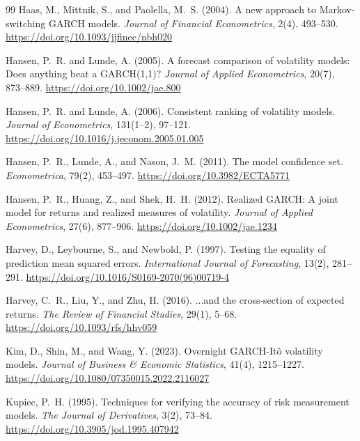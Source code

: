 \documentclass[11pt,a4paper]{article}
\begin{document}
\begin{thebibliography}{99}
Haas, M., Mittnik, S., and Paolella, M.~S. (2004).
\newblock A new approach to Markov-switching GARCH models.
\newblock \emph{Journal of Financial Econometrics}, 2(4), 493--530.
\newblock \url{https://doi.org/10.1093/jjfinec/nbh020}

Hansen, P.~R. and Lunde, A. (2005).
\newblock A forecast comparison of volatility models: Does anything beat a GARCH(1,1)?
\newblock \emph{Journal of Applied Econometrics}, 20(7), 873--889.
\newblock \url{https://doi.org/10.1002/jae.800}

Hansen, P.~R. and Lunde, A. (2006).
\newblock Consistent ranking of volatility models.
\newblock \emph{Journal of Econometrics}, 131(1--2), 97--121.
\newblock \url{https://doi.org/10.1016/j.jeconom.2005.01.005}

Hansen, P.~R., Lunde, A., and Nason, J.~M. (2011).
\newblock The model confidence set.
\newblock \emph{Econometrica}, 79(2), 453--497.
\newblock \url{https://doi.org/10.3982/ECTA5771}

Hansen, P.~R., Huang, Z., and Shek, H.~H. (2012).
\newblock Realized GARCH: A joint model for returns and realized measures of volatility.
\newblock \emph{Journal of Applied Econometrics}, 27(6), 877--906.
\newblock \url{https://doi.org/10.1002/jae.1234}

Harvey, D., Leybourne, S., and Newbold, P. (1997).
\newblock Testing the equality of prediction mean squared errors.
\newblock \emph{International Journal of Forecasting}, 13(2), 281--291.
\newblock \url{https://doi.org/10.1016/S0169-2070(96)00719-4}

Harvey, C.~R., Liu, Y., and Zhu, H. (2016).
\newblock ...and the cross-section of expected returns.
\newblock \emph{The Review of Financial Studies}, 29(1), 5--68.
\newblock \url{https://doi.org/10.1093/rfs/hhv059}

Kim, D., Shin, M., and Wang, Y. (2023).
\newblock Overnight GARCH-It\^{o} volatility models.
\newblock \emph{Journal of Business \& Economic Statistics}, 41(4), 1215--1227.
\newblock \url{https://doi.org/10.1080/07350015.2022.2116027}

Kupiec, P.~H. (1995).
\newblock Techniques for verifying the accuracy of risk measurement models.
\newblock \emph{The Journal of Derivatives}, 3(2), 73--84.
\newblock \url{https://doi.org/10.3905/jod.1995.407942}


\end{thebibliography}
\end{document}
